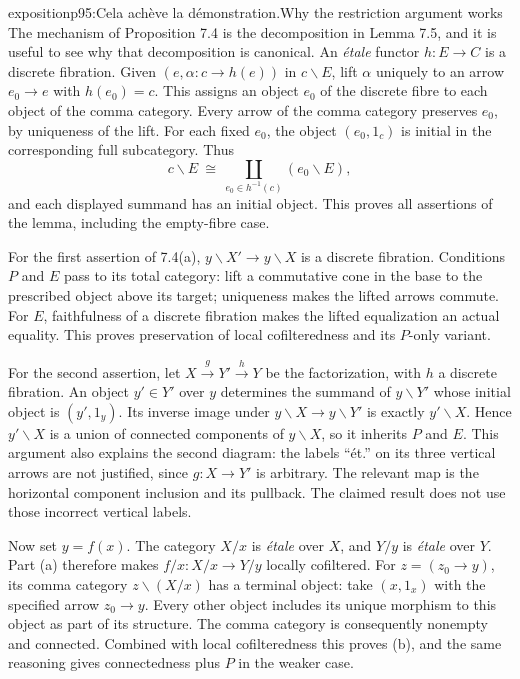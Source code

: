 \begin{dcomment}{exposition}{p95:Cela achève la démonstration.}{Why the restriction argument works}
The mechanism of Proposition 7.4 is the decomposition in Lemma 7.5, and it is useful to see why that decomposition is canonical. An \emph{\'etale} functor $h:E\to C$ is a discrete fibration. Given $(e,\alpha:c\to h(e))$ in $c\backslash E$, lift $\alpha$ uniquely to an arrow $e_0\to e$ with $h(e_0)=c$. This assigns an object $e_0$ of the discrete fibre to each object of the comma category. Every arrow of the comma category preserves $e_0$, by uniqueness of the lift. For each fixed $e_0$, the object $(e_0,1_c)$ is initial in the corresponding full subcategory. Thus
\[
c\backslash E\ \cong\
\coprod_{e_0\in h^{-1}(c)}(e_0\backslash E),
\]
and each displayed summand has an initial object. This proves all assertions of the lemma, including the empty-fibre case.

For the first assertion of 7.4(a), $y\backslash X'\to y\backslash X$ is a discrete fibration. Conditions $P$ and $E$ pass to its total category: lift a commutative cone in the base to the prescribed object above its target; uniqueness makes the lifted arrows commute. For $E$, faithfulness of a discrete fibration makes the lifted equalization an actual equality. This proves preservation of local cofilteredness and its $P$-only variant.

For the second assertion, let $X\xrightarrow{g}Y'\xrightarrow{h}Y$ be the factorization, with $h$ a discrete fibration. An object $y'\in Y'$ over $y$ determines the summand of $y\backslash Y'$ whose initial object is $(y',1_y)$. Its inverse image under $y\backslash X\to y\backslash Y'$ is exactly $y'\backslash X$. Hence $y'\backslash X$ is a union of connected components of $y\backslash X$, so it inherits $P$ and $E$. This argument also explains the second diagram: the labels ``\'et.'' on its three vertical arrows are not justified, since $g:X\to Y'$ is arbitrary. The relevant map is the horizontal component inclusion and its pullback. The claimed result does not use those incorrect vertical labels.

Now set $y=f(x)$. The category $X/x$ is \emph{\'etale} over $X$, and $Y/y$ is \emph{\'etale} over $Y$. Part (a) therefore makes $f/x:X/x\to Y/y$ locally cofiltered. For $z=(z_0\to y)$, its comma category $z\backslash(X/x)$ has a terminal object: take $(x,1_x)$ with the specified arrow $z_0\to y$. Every other object includes its unique morphism to this object as part of its structure. The comma category is consequently nonempty and connected. Combined with local cofilteredness this proves (b), and the same reasoning gives connectedness plus $P$ in the weaker case.


\end{dcomment}
